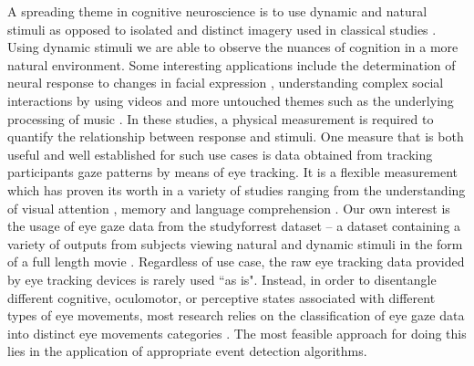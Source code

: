 A spreading theme in cognitive neuroscience is to use dynamic and natural
stimuli as opposed to isolated and distinct imagery used in classical studies
\citep{real_world}. Using dynamic stimuli we are able to observe the nuances of
cognition in a more natural environment. Some interesting applications include
the determination of neural response to changes in facial expression
\citep{Harris2014}, understanding complex social interactions by using videos
\citep{Tikka2012} and more untouched themes such as the underlying processing
of music \citep{Toiviainen2014}.  In these studies, a physical measurement is
required to quantify the relationship between response and stimuli.  One
measure that is both useful and well established for such use cases is data
obtained from tracking participants gaze patterns by means of eye tracking. It
is a flexible measurement which has proven its worth in a variety of studies
ranging from the understanding of visual attention \citep{HantaoLiu2011},
memory \citep{Hannula2010} and language comprehension \citep{Gordon2006}. Our
own interest is the usage of eye gaze data from the studyforrest dataset -- a
dataset containing a variety of outputs from subjects viewing natural and
dynamic stimuli in the form of a full length movie \citep{Hanke2016}.
Regardless of use case, the raw eye tracking data provided by eye tracking
devices is rarely used ``as is". Instead, in order to disentangle different
cognitive, oculomotor, or perceptive states associated with different types of
eye movements, most research relies on the classification of eye gaze data into
distinct eye movements categories \citep{Schutz2011}. The most feasible
approach for doing this lies in the application of appropriate event detection
algorithms.

